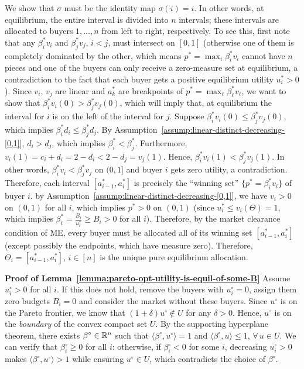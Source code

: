 		We show that $\sigma$ must be the identity map $\sigma(i) = i$. In other words, at equilibrium, the entire interval is divided into $n$ intervals; these intervals are allocated to buyers $1, \dots, n$ from left to right, respectively. To see this, first note that any $\beta^*_i v_i$ and $\beta^*_j v_j$, $i < j$, must intersect on $[0,1]$ (otherwise one of them is completely dominated by the other, which means $p^* = \max_i \beta^*_i v_i$ cannot have $n$ pieces and one of the buyers can only receive a zero-measure set at equilibrium, a contradiction to the fact that each buyer gets a positive equilibrium utility $u^*_i > 0$). 
		Since $v_i$, $v_j$ are linear and $a^*_k$ are breakpoints of $p^* = \max_\ell \beta^*_\ell v_\ell$, we want to show that $\beta^*_i v_i(0) > \beta^*_j v_j(0)$, which will imply that, at equilibrium the interval for $i$ is on the left of the interval for $j$. 
		Suppose $\beta^*_i v_i(0) \leq \beta^*_j v_j(0)$, which implies $\beta^*_i d_i \leq \beta^*_j d_j$. By Assumption~\ref{assump:linear-distinct-decreasing-[0,1]}, $d_i > d_j$, which implies $\beta^*_i < \beta^*_j$. Furthermore, $v_i(1) = c_i + d_i = 2- d_i < 2 - d_j = v_j(1)$.
		Hence, 
		$\beta^*_i v_i(1) < \beta^*_j v_j(1)$. 
		In other words, $\beta^*_i v_i < \beta^*_j v_j$ on $(0, 1]$ and buyer $i$ gets zero utility, a contradiction.
		Therefore, each interval $[a^*_{i-1}, a^*_i]$ is precisely the ``winning set'' $\{p^* = \beta^*_i v_i\}$ of buyer $i$. by Assumption~\ref{assump:linear-distinct-decreasing-[0,1]}, we have $v_i > 0$ on $(0,1)$ for all $i$, which implies $p^* > 0$ on $(0,1)$ (since $u^*_i \leq v_i(\Theta)=1$, which implies $\beta^*_i = \frac{B_i}{u^*_i} \geq B_i > 0$ for all $i$). Therefore, by the market clearance condition of ME, every buyer must be allocated all of its winning set $[a^*_{i-1}, a^*_i]$ (except possibly the endpoints, which have measure zero). 
		Therefore, $\Theta_i = [a^*_{i-1}, a^*_i]$, $i\in [n]$ is the unique pure equilibrium allocation. 
	

		\smallskip\noindent\textbf{Proof of Lemma~\ref{lemma:pareto-opt-utility-is-equil-of-some-B}}
		Assume $u^\circ_i>0$ for all $i$. 
	If this does not hold, remove the buyers with $u^\circ_i=0$, assign them zero budgets $B_i = 0$ and consider the market without these buyers. 
	Since $u^\circ$ is on the Pareto frontier, we know that $(1+\delta)u^\circ\notin U$ for any $\delta>0$. Hence, $u^\circ$ is on the \emph{boundary} of the convex compact set $U$. By the supporting hyperplane theorem, there exists $\beta^\circ\in \mathbb{R}^n$ such that 
	$\langle \beta^\circ, u^\circ \rangle = 1$ and $\langle \beta^\circ, u\rangle \leq 1,\, \forall\, u\in U$.
	We can verify that $\beta^\circ_i \geq 0$ for all $i$: otherwise, if $\beta^\circ_i < 0$ for some $i$, decreasing $u^\circ_i >0$ makes $\langle \beta^\circ, u^\circ \rangle > 1$ while ensuring $u^\circ\in U$, which contradicts the choice of $\beta^\circ$.

